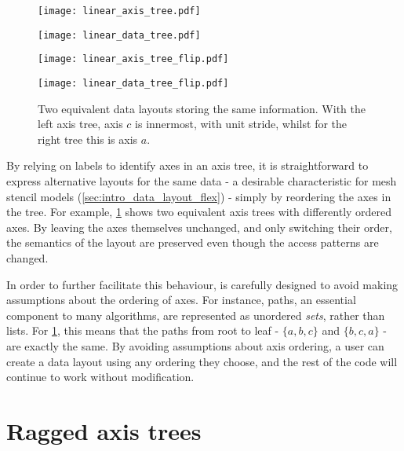 \documentclass[thesis]{subfiles}
\begin{document}
\begin{figure}
  \centering
  \begin{minipage}{.2\textwidth}
    \begin{center}
      \texttt{[image: linear\_axis\_tree.pdf]}
    \end{center}
  \end{minipage}
  \begin{minipage}{.28\textwidth}
    \texttt{[image: linear\_data\_tree.pdf]}
  \end{minipage}
  \begin{minipage}{.2\textwidth}
    \begin{center}
      \texttt{[image: linear\_axis\_tree\_flip.pdf]}
    \end{center}
  \end{minipage}
  \begin{minipage}{.28\textwidth}
    \texttt{[image: linear\_data\_tree\_flip.pdf]}
  \end{minipage}
  \caption{
    Two equivalent data layouts storing the same information.
    With the left axis tree, axis $c$ is innermost, with unit stride, whilst for the right tree this is axis $a$.
  }
  \label{fig:linear_axis_tree_flip}
\end{figure}

By relying on labels to identify axes in an axis tree, it is straightforward to express alternative layouts for the same data - a desirable characteristic for mesh stencil models (\cref{sec:intro_data_layout_flex}) - simply by reordering the axes in the tree.
For example, \cref{fig:linear_axis_tree_flip} shows two equivalent axis trees with differently ordered axes.
By leaving the axes themselves unchanged, and only switching their order, the semantics of the layout are preserved even though the access patterns are changed.

In order to further facilitate this behaviour,  is carefully designed to avoid making assumptions about the ordering of axes.
For instance, paths, an essential component to many algorithms, are represented as unordered \emph{sets}, rather than lists.
For \cref{fig:linear_axis_tree_flip}, this means that the paths from root to leaf - $\{ a, b, c \}$ and $\{ b, c, a \}$ - are exactly the same.
By avoiding assumptions about axis ordering, a user can create a data layout using any ordering they choose, and the rest of the code will continue to work without modification.

\section{Ragged axis trees}
\label{sec:ragged_axis_trees}
\end{document}
